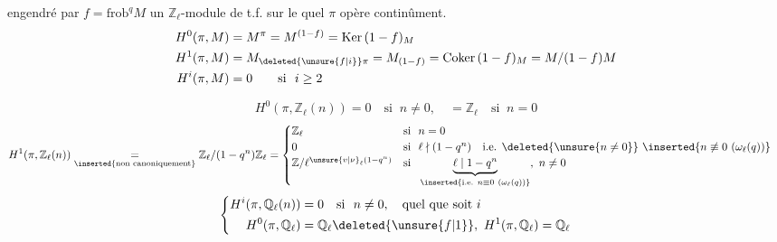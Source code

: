 
engendré par $f=\mathrm{frob}^{q}$\qquad $M$ un $\mathbb{Z}_\ell$-module de t.f. sur le quel $\pi$ opère continûment.
\[
\begin{aligned}
H^0(\pi,M)&=M^\pi=M^{(1-f)}=\mathrm{Ker}\,(1-f)_M\\
H^1(\pi,M)&=M_{\deleted{\unsure{f|i}}\pi}=M_{(1-f)}=\mathrm{Coker}\,(1-f)_M=M/(1-f)M\\
H^i(\pi,M)&=0\qquad\text{si }\ i\geq 2
\end{aligned}
\]

\[
H^0(\pi,\mathbb{Z}_\ell(n))=0\quad\text{si }\ n\ne0,\quad =\mathbb{Z}_\ell\quad\text{si }\ n=0
\]
\[
\begin{aligned}
H^1(\pi,\mathbb{Z}_\ell(n))&\underset{\text{\inserted{non canoniquement}}}{=}\mathbb{Z}_\ell/(1-q^n)\mathbb{Z}_\ell=\begin{cases}
\mathbb{Z}_\ell&\text{si }\ n=0\\
0&\text{si }\ \ell\nmid(1-q^n)\quad\text{i.e. }\deleted{\unsure{n\ne0}}\ \inserted{n\not\equiv0\ (\omega_\ell(q))}\\
\mathbb{Z}/\ell^{\unsure{v|\nu}_\ell(1-q^n)}&\text{si }\ \underbrace{\ell\mid1-q^n}_{\inserted{\text{i.e. }n\equiv0\ (\omega_\ell(q))}},\ n\ne0
\end{cases}
\end{aligned}
\]
\margin{$\circ\!\!-\!\!-$}
\[
\left\{\begin{aligned}
H^{i}(\pi,\mathbb{Q}_\ell(n))&=0\quad\text{si }\ n\ne0,\quad\text{quel que soit }i\\
H^0(\pi,\mathbb{Q}_\ell)&=\mathbb{Q}_\ell\deleted{\unsure{f|1}},\ H^1(\pi,\mathbb{Q}_\ell)=\mathbb{Q}_\ell
\end{aligned}\right.
\]

